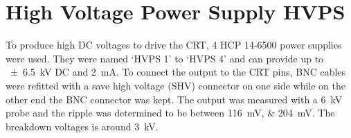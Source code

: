 \section{High Voltage Power Supply HVPS}\label{sec:HVPS}

To produce high DC voltages to drive the CRT, 4 HCP 14-6500\autocite{fug-hcp-manual} power supplies were used. They were named `HVPS 1' to `HVPS 4' and can provide up to \SI{\pm 6.5}{\kilo\volt} DC and \SI{2}{\milli\ampere}. To connect the output to the CRT pins, BNC cables were refitted with a save high voltage (SHV) connector on one side while on the other end the BNC connector was kept. The output was measured with a \SI{6}{\kilo\volt} probe and the ripple was determined to be between \SIlist{116;204}{\milli\volt}. The breakdown voltages is around \SI{3}{\kilo\volt}.

